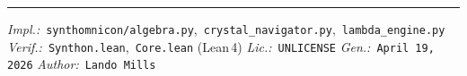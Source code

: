 \documentclass[8pt,a4paper,landscape]{article}
\begin{document}
\vfill
\noindent\hrule
\vspace{0.1em}
\noindent\footnotesize
\textit{Impl.:}\ \texttt{synthomnicon/algebra.py},\ \texttt{crystal\_navigator.py},\ \texttt{lambda\_engine.py}\quad
\textit{Verif.:}\ \texttt{Synthon.lean},\ \texttt{Core.lean} (Lean\,4)\quad
\textit{Lic.:}\ \texttt{UNLICENSE}\quad
\textit{Gen.:}\ \texttt{April 19, 2026}\quad
\textit{Author:}\ \texttt{Lando Mills}
\end{document}
